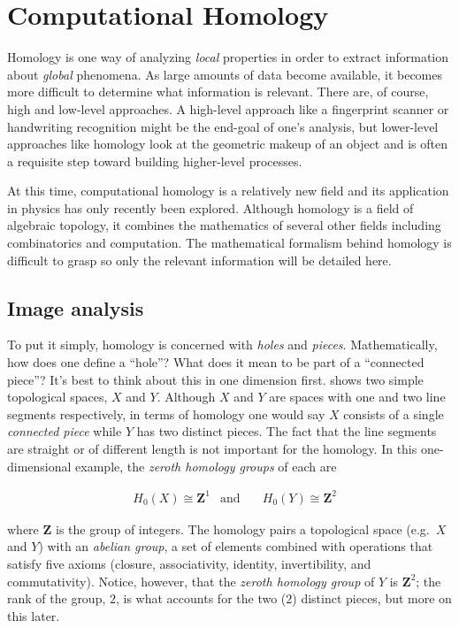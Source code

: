 \chapter{Computational Homology}

Homology is one way of analyzing \textit{local} properties in order to extract information about \textit{global} phenomena. As large amounts of data become available, it becomes more difficult to determine what information is relevant. There are, of course, high and low-level approaches. A high-level approach like a fingerprint scanner or handwriting recognition might be the end-goal of one's analysis, but lower-level approaches like homology look at the geometric makeup of an object and is often a requisite step toward building higher-level processes.

	At this time, computational homology is a relatively new field and its application in physics has only recently been explored. Although homology is a field of algebraic topology, it combines the mathematics of several other fields including combinatorics and computation. The mathematical formalism behind homology is difficult to grasp so only the relevant information will be detailed here.
	
\section{Image analysis}

To put it simply, homology is concerned with \textit{holes} and \textit{pieces}. Mathematically, how does one define a ``hole''? What does it mean to be part of a ``connected piece''? It's best to think about this in one dimension first.  shows two simple topological spaces, $X$ and $Y$. Although $X$ and $Y$ are spaces with one and two line segments respectively, in terms of homology one would say $X$ consists of a single \textit{connected piece} while $Y$ has two distinct pieces. The fact that the line segments are straight or of different length is not important for the homology. In this one-dimensional example, the \textit{zeroth homology groups} of each are

\begin{align}
	& H_0(X) \cong \mathbf{Z}^1  & \text{and} & \quad H_0(Y) \cong \mathbf{Z}^2
	\label{eq:homology1d}
\end{align}

where $\mathbf{Z}$ is the group of integers. The homology pairs a topological space (e.g.\ $X$ and $Y$) with an \textit{abelian group}, a set of elements combined with operations that satisfy five axioms (closure, associativity, identity, invertibility, and commutativity). Notice, however, that the \textit{zeroth homology group} of $Y$ is $\mathbf{Z}^2$; the rank of the group, $2$, is what accounts for the two ($2$) distinct pieces, but more on this later.

